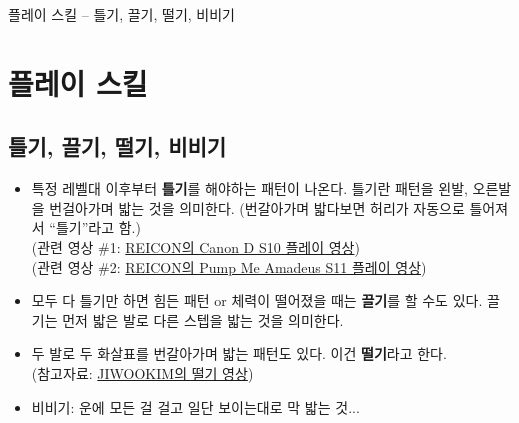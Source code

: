 \documentclass{beamer}
\begin{document}

\begin{frame}{플레이 스킬 -- 틀기, 끌기, 떨기, 비비기}
	\section{플레이 스킬}
	\subsection{틀기, 끌기, 떨기, 비비기}
	\begin{itemize}
		\item 특정 레벨대 이후부터 \textbf{틀기}를 해야하는 패턴이 나온다. 틀기란
		      패턴을 왼발, 오른발을 번걸아가며 밟는 것을 의미한다. (번갈아가며 밟다보면 허리가 자동으로 틀어져서 ``틀기''라고 함.) \\
			  (관련 영상 \#1: \href{https://www.youtube.com/watch?v=VO0ecPF6TEs}{REICON의 Canon D S10 플레이 영상}) \\
			  (관련 영상 \#2: \href{https://www.youtube.com/watch?v=seMfO-xS3GI}{REICON의 Pump Me Amadeus S11 플레이 영상})
		\item 모두 다 틀기만 하면 힘든 패턴 or 체력이 떨어졌을 때는 \textbf{끌기}를 할 수도 있다. 끌기는 먼저 밟은 발로 다른 스텝을 밟는 것을 의미한다.
		\item 두 발로 두 화살표를 번갈아가며 밟는 패턴도 있다. 이건 \textbf{떨기}라고 한다. \\
		(참고자료: \href{https://www.youtube.com/shorts/KMKJqTbQ-nQ}{JIWOOKIM의 떨기 영상})
		\item 비비기: 운에 모든 걸 걸고 일단 보이는대로 막 밟는 것...
	\end{itemize}
\end{frame}
\end{document}
